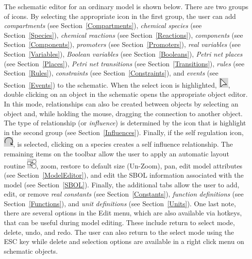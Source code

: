 \documentclass[titlepage,11pt]{article}
\begin{document}
The schematic editor for an ordinary model is shown below.  There are two groups of icons.  By selecting the appropriate icon in the first group, the user can add \emph{compartments} (see Section~\ref{Compartments}), \emph{chemical species} (see Section~\ref{Species}), 
\emph{chemical reactions} (see Section~\ref{Reactions}), \emph{components} (see Section~\ref{Components}), \emph{promoters} (see Section~\ref{Promoters}), \emph{real variables} (see Section~\ref{Variables}), \emph{Boolean variables} (see Section~\ref{Booleans}), \emph{Petri net places} (see Section~\ref{Places}), \emph{Petri net transitions} (see Section~\ref{Transitions}), \emph{rules} (see Section~\ref{Rules}), \emph{constraints} (see Section~\ref{Constraints}), and \emph{events} (see Section~\ref{Events}) to the schematic.  When the select icon is highlighted, \includegraphics{../gui/icons/modelview/select_mode_selected}, double clicking on an object in the schematic opens the appropriate object editor.  In this mode, relationships can also be created between objects by selecting an object and, while holding the mouse, dragging the connection to another object.  The type of relationship (or \emph{influence}) is determined by the icon that is highlight in the second group  (see Section~\ref{Influences}).  Finally, if the self regulation icon,
\includegraphics{../gui/icons/modelview/self_influence_selected}, is selected, clicking on a species creates a self influence relationship.  The remaining items on the toolbar allow the user to apply an automatic layout routine \includegraphics{../gui/icons/modelview/choose_layout_selected}, zoom, restore to default size (Un-Zoom), pan, edit model attributes (see Section~\ref{ModelEditor}), and edit the SBOL information associated with the model (see Section~\ref{SBOL}).  Finally, the additional tabs allow the user to add, edit, or remove \emph{real constants} (see Section~\ref{Constants}), \emph{function definitions} (see Section~\ref{Functions}), and \emph{unit definitions} (see Section~\ref{Units}).  One last note, there are several options in the Edit menu, which are also available via hotkeys, that can be useful during model editing.  These include return to select mode, delete, undo, and redo.  The user can also return to the select mode using the ESC key while delete and selection options are available in a right click menu on schematic objects.
\end{document}
